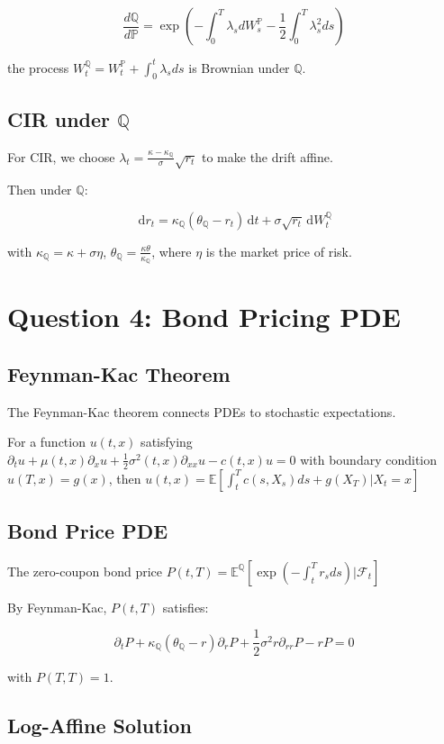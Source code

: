 \documentclass[11pt]{article}
\newcommand{\PP}{\mathbb{P}}
\newcommand{\QQ}{\mathbb{Q}}
\newcommand{\EE}{\mathbb{E}}
\newcommand{\FF}{\mathcal{F}}
\newcommand{\dd}{\,\mathrm{d}}
\begin{document}
\[
\frac{d\QQ}{d\PP} = \exp\left( -\int_0^T \lambda_s dW_s^\PP - \frac{1}{2} \int_0^T \lambda_s^2 ds \right)
\]

the process $W_t^\QQ = W_t^\PP + \int_0^t \lambda_s ds$ is Brownian under $\QQ$.

\subsection{CIR under $\QQ$}

For CIR, we choose $\lambda_t = \frac{\kappa - \kappa_\QQ}{\sigma} \sqrt{r_t}$ to make the drift affine.

Then under $\QQ$:

\[
\dd r_t = \kappa_\QQ (\theta_\QQ - r_t) \dd t + \sigma \sqrt{r_t} \dd W_t^\QQ
\]

with $\kappa_\QQ = \kappa + \sigma \eta$, $\theta_\QQ = \frac{\kappa \theta}{\kappa_\QQ}$, where $\eta$ is the market price of risk.

\section{Question 4: Bond Pricing PDE}

\subsection{Feynman-Kac Theorem}

The Feynman-Kac theorem connects PDEs to stochastic expectations.

For a function $u(t,x)$ satisfying $\partial_t u + \mu(t,x) \partial_x u + \frac{1}{2} \sigma^2(t,x) \partial_{xx} u - c(t,x) u = 0$ with boundary condition $u(T,x) = g(x)$, then $u(t,x) = \EE[ \int_t^T c(s,X_s) ds + g(X_T) | X_t = x ]$

\subsection{Bond Price PDE}

The zero-coupon bond price $P(t,T) = \EE^\QQ[ \exp(-\int_t^T r_s ds) | \FF_t ]$

By Feynman-Kac, $P(t,T)$ satisfies:

\[
\partial_t P + \kappa_\QQ (\theta_\QQ - r) \partial_r P + \frac{1}{2} \sigma^2 r \partial_{rr} P - r P = 0
\]

with $P(T,T) = 1$.

\subsection{Log-Affine Solution}
\end{document}
